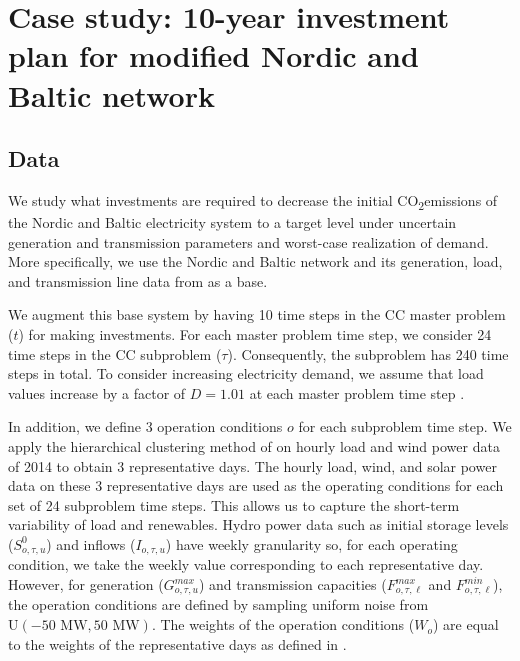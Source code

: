 \documentclass[final]{IEEEtran}
\newcommand{\COtwo}{CO\textsubscript{2}\;}
\begin{document}

\section{Case study: 10-year investment plan for modified Nordic and Baltic network}
\label{section_case_study}

\subsection{Data}

We study what investments are required to decrease the initial \COtwo emissions of the Nordic and Baltic electricity system to a target level under uncertain generation and transmission parameters and worst-case realization of demand. More specifically, we use the Nordic and Baltic network and its generation, load, and transmission line data from \cite{Virasjoki} as a base.

We augment this base system by having 10 time steps in the CC master problem ($t$) for making investments. For each master problem time step, we consider 24 time steps in the CC subproblem ($\tau$). Consequently, the subproblem has 240 time steps in total. To consider increasing electricity demand, we assume that load values increase by a factor of $D = 1.01$ at each master problem time step \cite{EEA_consumption}.

In addition, we define 3 operation conditions $o$ for each subproblem time step. We apply the hierarchical clustering method of \cite{Nahmmacher} on hourly load and wind power data of 2014 to obtain 3 representative days. The hourly load, wind, and solar power data on these 3 representative days are used as the operating conditions for each set of 24 subproblem time steps. This allows us to capture the short-term variability of load and renewables. Hydro power data such as initial storage levels ($S_{o, \tau, u}^0$) and inflows ($I_{o, \tau, u}$) have weekly granularity so, for each operating condition, we take the weekly value corresponding to each representative day. However, for generation ($G^{max}_{o, \tau, u}$) and transmission capacities ($F^{max}_{o, \tau, \ell}$ and $F^{min}_{o, \tau, \ell}$), the operation conditions are defined by sampling uniform noise from $\textrm{U}(-50 \textrm{ MW}, 50 \textrm{ MW})$. The weights of the operation conditions ($W_o$) are equal to the weights of the representative days as defined in \cite{Nahmmacher}.
\end{document}
